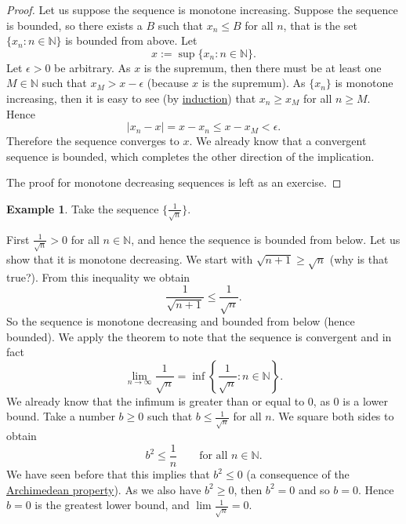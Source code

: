 \documentclass[12pt]{book}
\newcommand{\abs}[1]{\left\lvert {#1} \right\rvert}
\newcommand{\N}{{\mathbb{N}}}
\theoremstyle{plain}
\theoremstyle{remark}
\theoremstyle{definition}
\theoremstyle{exercise}
\theoremstyle{example}
\newtheorem{example}[thm]{Example}
\begin{document}
\begin{proof}
Let us suppose the sequence is monotone increasing.  Suppose 
the sequence is bounded, so there exists a $B$
such that $x_n \leq B$ for all $n$, that is the set
$\{ x_n : n \in  \N \}$ is bounded from above.  Let
\begin{equation*}
x := \sup \{ x_n : n \in \N \} .
\end{equation*}
Let $\epsilon > 0$ be arbitrary.  As $x$ is the supremum, then
there must be at least one $M \in \N$ such that $x_{M} > x-\epsilon$
(because $x$ is the supremum).  As $\{ x_n \}$ is monotone increasing,
then it is easy to see (by \hyperref[induction:thm]{induction}) that
$x_n \geq x_{M}$ for all $n \geq M$.  Hence
\begin{equation*}
\abs{x_n-x} = x-x_n \leq x-x_{M} < \epsilon  .
\end{equation*}
Therefore the sequence converges to $x$.
We already know that a convergent sequence is bounded, which completes the
other direction of the implication.

The proof for monotone decreasing sequences is left as an exercise.
\end{proof}

\begin{example}
Take the sequence $\bigl\{ \frac{1}{\sqrt{n}} \bigr\}$.

First $\frac{1}{\sqrt{n}} > 0$ for all $n \in \N$, and hence the sequence is
bounded from below.
Let us show that it is monotone decreasing.  We start with
$\sqrt{n+1} \geq \sqrt{n}$ (why is that true?).  From this inequality
we obtain
\begin{equation*}
\frac{1}{\sqrt{n+1}} \leq \frac{1}{\sqrt{n}} .
\end{equation*}
So the sequence is monotone decreasing and bounded from below (hence
bounded).  We apply the theorem to note that the sequence is
convergent and in fact
\begin{equation*}
\lim_{n\to \infty} \frac{1}{\sqrt{n}}
=
\inf \left\{ \frac{1}{\sqrt{n}} : n \in \N \right\} .
\end{equation*}
We already know that the infimum is greater than or equal to 0, as
0 is a lower bound.  Take a number $b \geq 0$ such
that $b \leq \frac{1}{\sqrt{n}}$ for all $n$.  We square both sides to
obtain
\begin{equation*}
b^2 \leq \frac{1}{n} \qquad \text{for all $n \in \N$}.
\end{equation*}
We have seen before that this implies that $b^2 \leq 0$ (a consequence
of the \hyperref[thm:arch:i]{Archimedean property}).  As we also have $b^2 \geq 0$, then $b^2 = 0$
and so $b = 0$.
Hence $b=0$ is the greatest lower bound, and $\lim \frac{1}{\sqrt{n}} = 0$.
\end{example}
\end{document}
